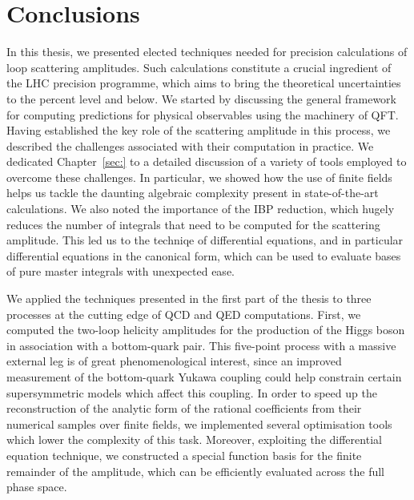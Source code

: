\documentclass[main.tex]{subfiles}
\begin{document}
\chapter{Conclusions} \label{sec:conclusions}
In this thesis, we presented elected techniques needed for precision calculations of loop scattering amplitudes. Such calculations constitute a crucial ingredient of the LHC precision programme, which aims to bring the theoretical uncertainties to the percent level and below. We started by discussing the general framework for computing predictions for physical observables using the machinery of QFT. Having established the key role of the scattering amplitude in this process, we described the challenges associated with their computation in practice. We dedicated Chapter~\ref{sec:} to a detailed discussion of a variety of tools employed to overcome these challenges. In particular, we showed how the use of finite fields helps us tackle the daunting algebraic complexity present in state-of-the-art calculations. We also noted the importance of the IBP reduction, which hugely reduces the number of integrals that need to be computed for the scattering amplitude. This led us to the techniqe of differential equations, and in particular differential equations in the canonical form, which can be used to evaluate bases of pure master integrals with unexpected ease.

We applied the techniques presented in the first part of the thesis to three processes at the cutting edge of QCD and QED computations. First, we computed the two-loop helicity amplitudes for the production of the Higgs boson in association with a bottom-quark pair. This five-point process with a massive external leg is of great phenomenological interest, since an improved measurement of the bottom-quark Yukawa coupling could help constrain certain supersymmetric models which affect this coupling. In order to speed up the reconstruction of the analytic form of the rational coefficients from their numerical samples over finite fields, we implemented several optimisation tools which lower the complexity of this task. Moreover, exploiting the differential equation technique, we constructed a special function basis for the finite remainder of the amplitude, which can be efficiently evaluated across the full phase space.
\end{document}
